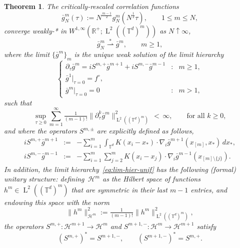 \documentclass[a4paper,11pt,reqno,noindent]{amsart}
\theoremstyle{plain}
\newtheorem{theor}[lem]{Theorem}
\numberwithin{equation}{section}
\newcommand{\R}{\mathbb R}
\newcommand{\T}{\mathbb T}
\newcommand{\Hc}{\mathcal H}
\newcommand{\3}{|\!|\!|}
\newcommand{\Ld}{\operatorname{L}}
\newcommand{\cvf}{\rightharpoonup}
\begin{document}
\begin{theor}\label{th:unif-wave-2}
The critically-rescaled correlation functions
\begin{equation}\label{eq:rescaled-correl-1}
\bar g_N^m(\tau):=N^\frac{m-1}2g_N^m(N^\frac12\tau),\qquad1\le m\le N,
\end{equation}
converge weakly-* in $W^{1,\infty}(\R^+;\Ld^2((\T^d)^m))$ as $N\uparrow\infty$,
\[\bar g_N^m\overset*\cvf\bar g^m,\qquad m\ge1,\]
where the limit $\{\bar g^m\}_m$ is the unique weak solution of the limit hierarchy
\begin{equation}\label{eq:lim-hier-unif}
\left\{\begin{array}{lll}
\partial_\tau\bar g^m=iS^{m,+}\bar g^{m+1}+iS^{m,-}\bar g^{m-1}&:&m\ge1,\\
\bar g^1|_{\tau=0}=f^{\circ},\\
\bar g^m|_{\tau=0}=0&:&m>1,
\end{array}\right.
\end{equation}
such that
\begin{equation}\label{eq:estim-energy-dt}
\sup_{\tau\ge0}\sum_{m=1}^\infty\tfrac1{(m-1)!}\|\partial_\tau^k\bar g^m\|^2_{\Ld^2((\T^d)^m)}\,<\,\infty,\qquad\text{for all $k\ge0$},
\end{equation}
and where the operators $S^{m,\pm}$ are explicitly defined as follows,
\begin{eqnarray*}
iS^{m,+}\bar g^{m+1}&:=&-\sum_{i=1}^m\int_{\T^d}K(x_i-x_*)\cdot\nabla_i\bar g^{m+1}(x_{[m]},x_*)\,dx_*,\\
iS^{m,-}\bar g^{m-1}&:=&-\sum_{i=1}^m\sum_{j=2}^mK(x_i-x_j)\cdot\nabla_i\bar g^{m-1}(x_{[m]\setminus\{j\}}).
\end{eqnarray*}
In addition, the limit hierarchy~\eqref{eq:lim-hier-unif} has the following (formal) unitary structure:
defining~$\Hc^m$ as the Hilbert space of functions $h^m\in\Ld^2((\T^d)^m)$ that are symmetric in their last $m-1$ entries, and endowing this space with the norm
\[\|h^m\|_{\Hc^m}^2:=\tfrac1{(m-1)!}\|h^m\|_{\Ld^2((\T^d)^m)}^2,\]
the operators $S^{m,+}:\Hc^{m+1}\to\Hc^m$ and $S^{m+1,-}:\Hc^{m}\to\Hc^{m+1}$ satisfy
\begin{equation}\label{eq:sym-S+S-}
(S^{m,+})^*=S^{m+1,-},\qquad (S^{m+1,-})^*=S^{m,+}.
\end{equation}
\end{theor}
\end{document}
